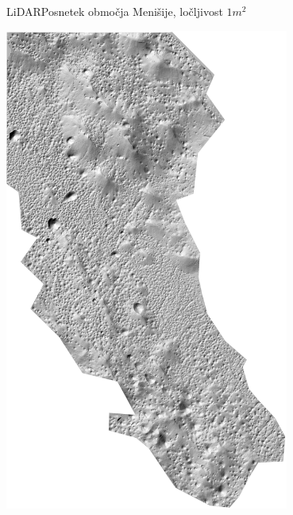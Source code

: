\documentclass{beamer}
\begin{document}

\begin{frame}{LiDAR}{Posnetek območja Menišije, ločljivost $1m^2$}
\begin{center}
  \hspace*{-0.95cm}\includegraphics[width=0.7\textwidth,angle=90]{slike/menisija-relief}
\end{center}
\end{frame}
\end{document}
